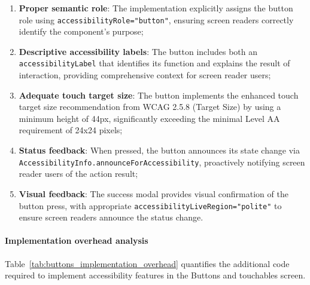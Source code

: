\begin{enumerate}
    \item \textbf{Proper semantic role}: The implementation explicitly assigns the button role using \texttt{accessibilityRole="button"}, ensuring screen readers correctly identify the component's purpose;
    
    \item \textbf{Descriptive accessibility labels}: The button includes both an \texttt{accessibilityLabel} that identifies its function and explains the result of interaction, providing comprehensive context for screen reader users;
    
    \item \textbf{Adequate touch target size}: The button implements the enhanced touch target size recommendation from WCAG 2.5.8 (Target Size) by using a minimum height of 44px, significantly exceeding the minimal Level AA requirement of 24x24 pixels;
    
    \item \textbf{Status feedback}: When pressed, the button announces its state change via \\\texttt{AccessibilityInfo.announceForAccessibility}, proactively notifying screen reader users of the action result;
    
    \item \textbf{Visual feedback}: The success modal provides visual confirmation of the button press, with appropriate \texttt{accessibilityLiveRegion="polite"} to ensure screen readers announce the status change.
\end{enumerate}

\paragraph{Implementation overhead analysis}

Table~\ref{tab:buttons_implementation_overhead} quantifies the additional code required to implement accessibility features in the Buttons and touchables screen.

